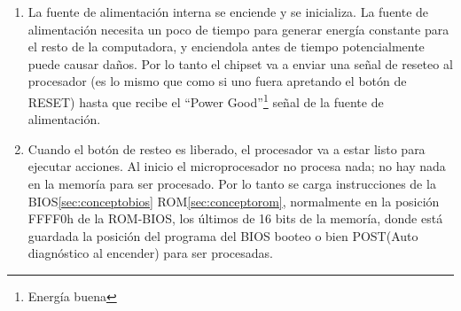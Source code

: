 	\begin{enumerate}

	
		\item[1] La fuente de alimentación interna se enciende y se inicializa.
			La fuente de alimentación necesita un poco de tiempo para generar
			energía constante para el resto de la computadora, y enciendola
			antes de tiempo potencialmente puede causar daños. Por lo tanto el
			chipset va a enviar una señal de reseteo al procesador (es lo mismo
			que como si uno fuera apretando el botón de RESET) hasta que recibe
			el ``Power Good''\footnote{Energía buena} señal de la fuente de
			alimentación.

	
		\item[2] Cuando el botón de resteo es liberado, el procesador va a
			estar listo para ejecutar acciones.  Al inicio el microprocesador
			no procesa nada; no hay nada en la memoría para ser procesado.  Por
			lo tanto se carga instrucciones de la BIOS\ref{sec:conceptobios}
			ROM\ref{sec:conceptorom}, normalmente en la posición FFFF0h de la
			ROM-BIOS, los últimos de 16 bits de la memoría, donde está guardada
			la posición del programa del BIOS booteo o bien POST(Auto
			diagnóstico al encender) para ser procesadas.

	

\end{enumerate}

